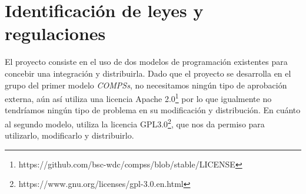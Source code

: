 \section{Identificación de leyes y regulaciones}

El proyecto consiste en el uso de dos modelos de programación existentes para concebir una integración y distribuirla. Dado que el proyecto se desarrolla en el grupo del primer modelo \textit{COMPSs}, no necesitamos ningún tipo de aprobación externa, aún así utiliza una licencia Apache 2.0\footnote{https://github.com/bsc-wdc/compss/blob/stable/LICENSE} por lo que igualmente no tendríamos ningún tipo de problema en su modificación y distribución. En cuánto al segundo modelo, utiliza la licencia GPL3.0\footnote{https://www.gnu.org/licenses/gpl-3.0.en.html}, que nos da permiso para utilizarlo, modificarlo y distribuirlo.



